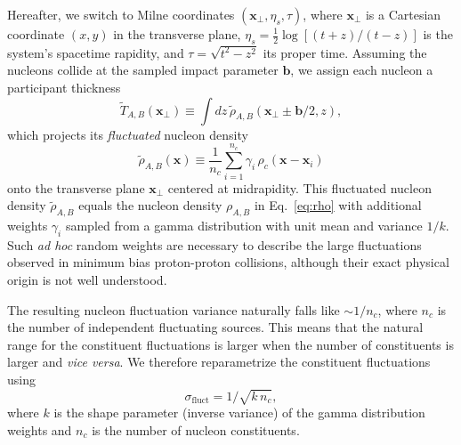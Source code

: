 \documentclass[aps,prc,reprint,amsmath,nofootinbib]{revtex4-1}
\newcommand{\T}{\tilde{T}}
\newcommand{\bv}{\mathbf b}
\newcommand{\xv}{\mathbf x}
\begin{document}
Hereafter, we switch to Milne coordinates $(\xv_\perp, \eta_s, \tau)$, where $\xv_\perp$ is a Cartesian coordinate $(x, y)$ in the transverse plane, $\eta_s = \tfrac{1}{2} \log[(t+z)/(t-z)]$ is the system's spacetime rapidity, and $\tau = \sqrt{t^2 - z^2}$ its proper time.
Assuming the nucleons collide at the sampled impact parameter $\bv$, we assign each nucleon a participant thickness
\begin{equation}
  \label{eq:fluctuated_thick}
  \T_{A, B}(\xv_\perp) \equiv \int dz\, \tilde{\rho}_{A,B}(\xv_\perp \pm \bv/2, z),
\end{equation}
which projects its \emph{fluctuated} nucleon density
\begin{equation}
  \tilde{\rho}_{A,B}(\xv) \equiv \frac{1}{n_c} \sum\limits_{i=1}^{n_c} \gamma_i\, \rho_c(\xv - \xv_i)
\end{equation}
onto the transverse plane $\xv_\perp$ centered at midrapidity.
This fluctuated nucleon density $\tilde{\rho}_{A,B}$ equals the nucleon density $\rho_{A,B}$ in Eq.~\eqref{eq:rho} with additional weights $\gamma_i$ sampled from a gamma distribution with unit mean and variance $1/k$.
Such \emph{ad hoc} random weights are necessary to describe the large fluctuations observed in minimum bias proton-proton collisions, although their exact physical origin is not well understood.

The resulting nucleon fluctuation variance naturally falls like ${\sim}1/ n_c$, where $n_c$ is the number of independent fluctuating sources.
This means that the natural range for the constituent fluctuations is larger when the number of constituents is larger and \emph{vice versa}.
We therefore reparametrize the constituent fluctuations using
\begin{equation}
  \sigma_\mathrm{fluct} = 1 / \sqrt{k\, n_c},
\end{equation}
where $k$ is the shape parameter (inverse variance) of the gamma distribution weights and $n_c$ is the number of nucleon constituents.
\end{document}
